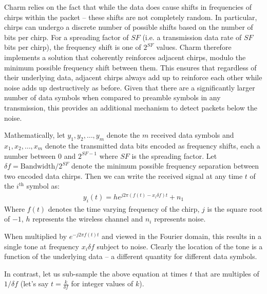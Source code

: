 Charm relies on the fact that while the data does cause shifts in frequencies of chirps within the packet -- these shifts are not completely random. In particular, chirps can undergo a discrete number of possible shifts based on the number of bits per chirp. For a spreading factor of $SF$ (i.e. a transmission data rate of $SF$ bits per chirp), the frequency shift is one of $2^{SF}$ values. Charm therefore implements a solution that coherently reinforces adjacent chirps, modulo the minimum possible frequency shift between them. This ensures that regardless of their underlying data, adjacent chirps always add up to reinforce each other while noise adds up destructively as before. Given that there are a significantly larger number of data symbols when compared to preamble symbols in any transmission, this provides an additional mechanism to detect packets below the noise. 

Mathematically, let $y_1, y_2, \dots, y_m$ denote the $m$ received data symbols and $x_1, x_2, \dots, x_m$ denote the transmitted data bits encoded as frequency shifts, each a number between $0$ and $2^{SF-1}$ where $SF$ is the spreading factor. Let $\delta f = \text{Bandwidth} / 2^{SF}$ denote the minimum possible frequency separation between two encoded data chirps.  Then we can write the received signal at any time $t$ of the $i^{\text{th}}$ symbol as:
\begin{align}
    y_i(t) = h e^{j 2 \pi (f(t) - x_i \delta f) t} + n_1 \label{eqn:yi}
\end{align}
Where $f(t)$ denotes the time varying frequency of the chirp, $j$ is the square root of $-1$, $h$ represents the wireless channel and $n_i$ represents noise. 

When multiplied by $e^{-j 2 \pi f(t) t}$ and viewed in the Fourier domain, this results in a single tone at frequency $x_i \delta f$ subject to noise. Clearly the location of the tone is a function of the underlying data -- a different quantity for different data symbols. 

In contrast, let us sub-sample the above equation at times $t$ that are multiples of $1/\delta f$ (let's say $t = \frac{k}{\delta f}$ for integer values of $k$). 

